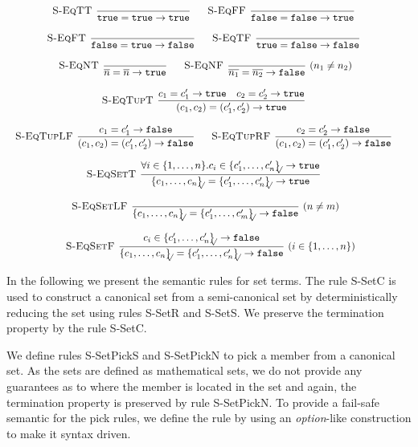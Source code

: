 \documentclass[a4paper]{article}
\newcommand{\s}[1]{\mathtt{#1}}
\newcommand{\sLb}{\s{\{}}
\newcommand{\sRb}{\s{\}}}
\newcommand{\strue}{\s{true}}
\newcommand{\sfalse}{\s{false}}
\newcommand{\sset}[1]{\sLb #1 \sRb}
\newcommand{\ssetc}[1]{\sset{#1}_{\!\!\!\surd}}
\newcommand{\step}{\to}
\renewcommand{\rule}[3][]{\ \mbox{\textsc{#1 }}\dfrac{#2}{#3}\ }
\begin{document}
\[\begin{array}{c}
\rule[S-EqTT]{}{\strue = \strue \step \strue}
\quad
\rule[S-EqFF]{}{\sfalse = \sfalse \step \strue}
\quad\\\\
\rule[S-EqFT]{}{\sfalse = \strue \step \sfalse}
\quad
\rule[S-EqTF]{}{\strue = \sfalse \step \sfalse}
\quad\\\\
\rule[S-EqNT]{}{\overline{n} = \overline{n} \step \strue}
\quad
\rule[S-EqNF]{}{\overline{n_1} = \overline{n_2} \step \sfalse} (n_1 \neq n_2)
\quad\\\\
\rule[S-EqTupT]{c_1 = c_1' \step \strue \quad c_2 = c_2' \step \strue}
  {(c_1, c_2) = (c_1', c_2') \step \strue}
\quad\\\\
\rule[S-EqTupLF]{c_1 = c_1' \step \sfalse}
  {(c_1, c_2) = (c_1', c_2') \step \sfalse}
\quad
\rule[S-EqTupRF]{c_2 = c_2' \step \sfalse}
  {(c_1, c_2) = (c_1', c_2') \step \sfalse}
\quad\\\\
\rule[S-EqSetT]{\forall i \in \{1,\ldots,n\}. c_i \in  \ssetc{c'_1,\ldots,c'_n} \step \strue}
  {\ssetc{c_1,\ldots,c_n} = \ssetc{c'_1,\ldots,c'_n} \step \strue}
\quad\\\\
\rule[S-EqSetLF]{}{\ssetc{c_1,\ldots,c_n} = \ssetc{c'_1,\ldots,c'_m} \step \sfalse}(n \neq m)
\quad\\\\
\rule[S-EqSetF]{c_i \in \ssetc{c'_1,\ldots,c'_n} \step \sfalse}
  {\ssetc{c_1,\ldots,c_n} = \ssetc{c'_1,\ldots,c'_n} \step \sfalse}(i \in \{1,\ldots,n\})
\end{array}\]

In the following we present the semantic rules for set terms. The rule S-SetC is used to construct a canonical set from a semi-canonical set by deterministically reducing the set using rules S-SetR and S-SetS. We preserve the termination property by the rule S-SetC.

We define rules S-SetPickS and S-SetPickN to pick a member from a canonical set. As the sets are defined as mathematical sets, we do not provide any guarantees as to where the member is located in the set and again, the termination property is preserved by rule S-SetPickN. To provide a fail-safe semantic for the pick rules, we define the rule by using an \emph{option}-like construction to make it syntax driven.
\end{document}
